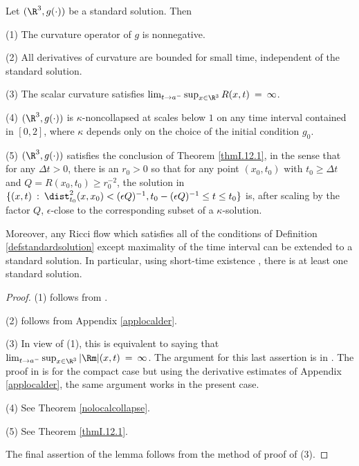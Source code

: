 \begin{lemma}
  \label{lem:kl-standard-solutions-existence-kappa-solutions}

\label{lemstandard0}
Let $(\R^3,g(\cdot))$ be a standard solution.  Then

(1) The curvature operator of $g$ is nonnegative.

(2) All derivatives of curvature are bounded for small time,
independent of the standard solution.

(3) The scalar curvature satisfies $\lim_{t \rightarrow a^-}
\sup_{x \in \R^3} R(x,t) \: = \: \infty$.

(4) $(\R^3,g(\cdot))$ is $\kappa$-noncollapsed at scales below $1$ on any time
interval contained in $[0,2]$, where
$\kappa$ depends only on the choice of the initial condition $g_0$.

(5) $(\R^3,g(\cdot))$ satisfies the conclusion of Theorem \ref{thmI.12.1},
in the sense that for any $\Delta t > 0$, there is an $r_0 > 0$ so that
for any point $(x_0, t_0)$ with $t_0 \ge \Delta t$ and
$Q = R(x_0, t_0) \ge r_0^{-2}$, the solution in
$\{(x,t) \: : \: \dist_{t_0}^2(x, x_0) < (\epsilon Q)^{-1}, t_0 - (\epsilon Q)^{-1}
\le t \le t_0\}$ is, after scaling by the factor $Q$, $\epsilon$-close to the
corresponding subset of a $\kappa$-solution.

Moreover, any Ricci flow which satisfies all of the conditions of Definition
\ref{defstandardsolution} except maximality of the time interval can be
extended to a standard solution. In particular, using short-time
existence \cite[Theorem 1.1]{Shi2 (1989)}, there is at least one standard solution.
\end{lemma}
\begin{proof}
(1) follows from \cite[Theorem 4.14]{Shi3 (1989)}.

(2) follows from Appendix \ref{applocalder}.

(3)
In view of (1), this is equivalent to saying that
$\lim_{t \rightarrow a^-}
\sup_{x \in \R^3} |\Rm|(x,t) \: = \: \infty$. The argument for
this last assertion
is in \cite[Chapter 6.7.2]{Chow-Knopf}. The proof in
\cite[Chapter 6.7.2]{Chow-Knopf}
is for the compact case but using the derivative estimates of
Appendix \ref{applocalder}, the same argument works in
the present case.


(4) See Theorem \ref{nolocalcollapse}.

(5) See Theorem \ref{thmI.12.1}.

The final assertion of the lemma follows from the method of
proof of (3).
\end{proof}

